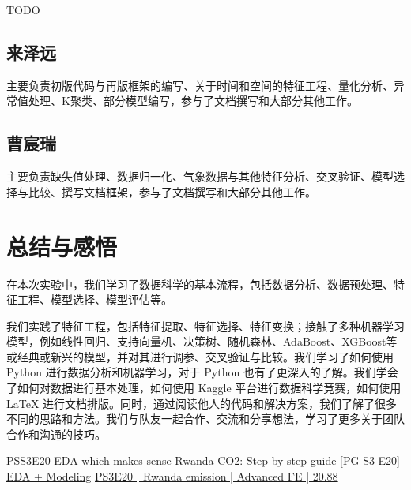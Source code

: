 \documentclass{ctexart}
\begin{document}
TODO

\subsection{来泽远}

主要负责初版代码与再版框架的编写、关于时间和空间的特征工程、量化分析、异常值处理、K聚类、部分模型编写，参与了文档撰写和大部分其他工作。

\subsection{曹宸瑞}

主要负责缺失值处理、数据归一化、气象数据与其他特征分析、交叉验证、模型选择与比较、撰写文档框架，参与了文档撰写和大部分其他工作。

\section{总结与感悟}

在本次实验中，我们学习了数据科学的基本流程，包括数据分析、数据预处理、特征工程、模型选择、模型评估等。

我们实践了特征工程，包括特征提取、特征选择、特征变换；接触了多种机器学习模型，例如线性回归、支持向量机、决策树、随机森林、AdaBoost、XGBoost等或经典或新兴的模型，并对其进行调参、交叉验证与比较。我们学习了如何使用 Python 进行数据分析和机器学习，对于 Python 也有了更深入的了解。我们学会了如何对数据进行基本处理，如何使用 Kaggle 平台进行数据科学竞赛，如何使用 \LaTeX{} 进行文档排版。同时，通过阅读他人的代码和解决方案，我们了解了很多不同的思路和方法。我们与队友一起合作、交流和分享想法，学习了更多关于团队合作和沟通的技巧。

\begin{thebibliography}{100}
\href{https://www.kaggle.com/code/ambrosm/pss3e20-eda-which-makes-sense}{PSS3E20 EDA which makes sense}
\href{https://www.kaggle.com/code/kacperrabczewski/rwanda-co2-step-by-step-guide}{Rwanda CO2: Step by step guide}
\href{https://www.kaggle.com/code/yaaangzhou/pg-s3-e20-eda-modeling}{[PG S3 E20] EDA + Modeling}
\href{https://www.kaggle.com/code/dmitryuarov/ps3e20-rwanda-emission-advanced-fe-20-88}{PS3E20 | Rwanda emission | Advanced FE | 20.88}
\end{thebibliography}
\end{document}

